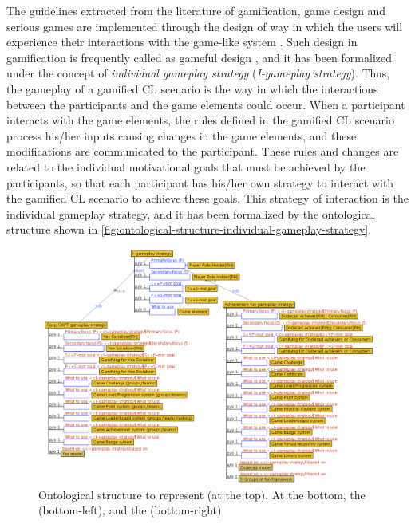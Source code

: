 The guidelines extracted from the literature of gamification, game design and serious games are implemented through the design of way in which the users will experience their interactions with the game-like system \cite{FabricatoreLopez2014, NackeDrachenGobel2010, Schell2008}.
Such design in gamification is frequently called as gameful design \cite{DeterdingDixonKhaledNacke2011, DichevDichevaAngelovaAgre2014}, and it has been formalized under the concept of \emph{individual gameplay strategy} (\emph{I-gameplay strategy}).
Thus, the gameplay of a gamified CL scenario is the way in which the interactions between the participants and the game elements could occur.
When a participant interacts with the game elements, the rules defined in the gamified CL scenario process his/her inputs causing changes in the game elements, and these modifications are communicated to the participant.
These rules and changes are related to the individual motivational goals that must be achieved by the participants, so that each participant has his/her own strategy to interact with the gamified CL scenario to achieve these goals. 
This strategy of interaction is the individual gameplay strategy, and it has been formalized by the ontological structure shown in \autoref{fig:ontological-structure-individual-gameplay-strategy}.

\begin{figure}[!htbp]
 \caption[Ontological structure to represent individual gameplay strategy]{Ontological structure to represent  (at the top). At the bottom, the  (bottom-left), and the  (bottom-right)}
 \label{fig:ontological-structure-individual-gameplay-strategy}
 \centering
 \includegraphics[width=1\textwidth]{images/chap-ontogacles1/ontological-structure-individual-gameplay-strategy.png} 
 \fautor
\end{figure}

